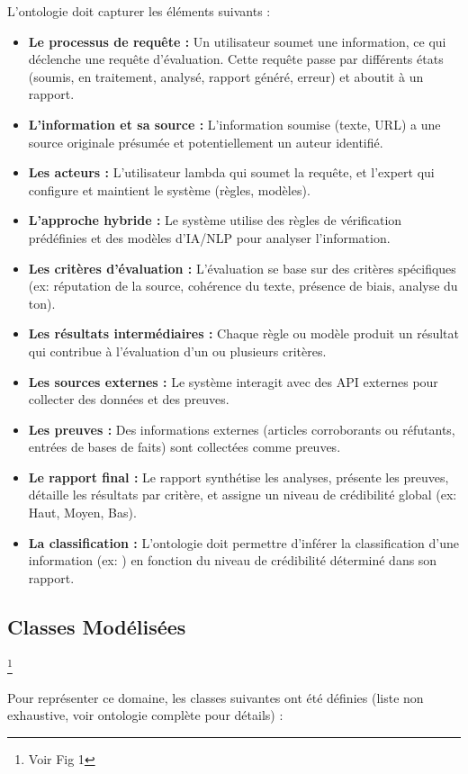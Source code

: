 \documentclass[9pt,twocolumn,twoside,french]{article}
\begin{document}
L'ontologie doit capturer les éléments suivants :
\begin{itemize}
    \item \textbf{Le processus de requête :} Un utilisateur soumet une information, ce qui déclenche une requête d'évaluation. Cette requête passe par différents états (soumis, en traitement, analysé, rapport généré, erreur) et aboutit à un rapport.
    \item \textbf{L'information et sa source :} L'information soumise (texte, URL) a une source originale présumée et potentiellement un auteur identifié.
    \item \textbf{Les acteurs :} L'utilisateur lambda qui soumet la requête, et l'expert qui configure et maintient le système (règles, modèles).
    \item \textbf{L'approche hybride :} Le système utilise des règles de vérification prédéfinies et des modèles d'IA/NLP pour analyser l'information.
    \item \textbf{Les critères d'évaluation :} L'évaluation se base sur des critères spécifiques (ex: réputation de la source, cohérence du texte, présence de biais, analyse du ton).
    \item \textbf{Les résultats intermédiaires :} Chaque règle ou modèle produit un résultat qui contribue à l'évaluation d'un ou plusieurs critères.
    \item \textbf{Les sources externes :} Le système interagit avec des API externes pour collecter des données et des preuves.
    \item \textbf{Les preuves :} Des informations externes (articles corroborants ou réfutants, entrées de bases de faits) sont collectées comme preuves.
    \item \textbf{Le rapport final :} Le rapport synthétise les analyses, présente les preuves, détaille les résultats par critère, et assigne un niveau de crédibilité global (ex: Haut, Moyen, Bas).
    \item \textbf{La classification :} L'ontologie doit permettre d'inférer la classification d'une information (ex: ) en fonction du niveau de crédibilité déterminé dans son rapport.
\end{itemize}

\subsection{Classes Modélisées} \footnote{Voir Fig 1}

Pour représenter ce domaine, les classes suivantes ont été définies (liste non exhaustive, voir ontologie complète pour détails) :
\end{document}
